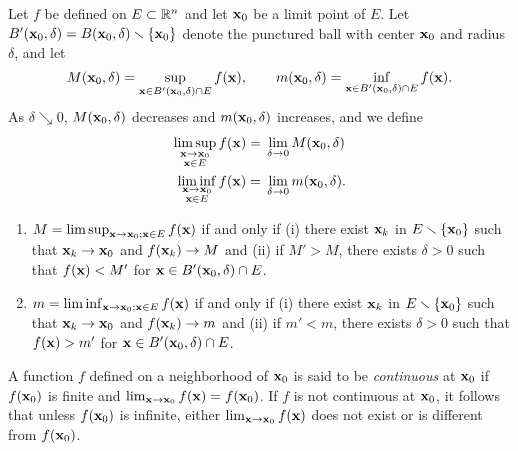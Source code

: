 Let $f$ be defined on $E\subset\mathbb{R}^n$ and let $\mathbf{x}_0$ be a limit point of
$E$. Let $B'(\mathbf{x}_0,\delta)= B(\mathbf{x}_0,\delta)\smallsetminus\{\mathbf{x}_0\}$
denote the punctured ball with center $\mathbf{x}_0$ and radius $\delta$, and let
\begin{equation}
\label{eq:sup-inf-ball}
M(\mathbf{x}_0,\delta)=\sup_{\mathbf{x}\in B'(\mathbf{x}_0,\delta)\cap E}
f(\mathbf{x}),\qquad
m(\mathbf{x}_0,\delta)=\inf_{\mathbf{x}\in B'(\mathbf{x}_0,\delta)\cap E}
f(\mathbf{x}).
\end{equation}
As $\delta\searrow 0$, $M(\mathbf{x}_0,\delta)$ decreases and $m(\mathbf{x}_0,\delta)$
increases, and we define
\begin{equation}
  \label{eq:ball-limsup-liminf}
\begin{aligned}
\limsup_{\substack{\mathbf{x}\to\mathbf{x}_0\\\mathbf{x}\in E}} f(\mathbf{x})
={}&\lim_{\delta\to 0}M(\mathbf{x}_0,\delta)\\
\liminf_{\substack{\mathbf{x}\to\mathbf{x}_0\\\mathbf{x}\in E}} f(\mathbf{x})
={}&\lim_{\delta\to 0}m(\mathbf{x}_0,\delta).
\end{aligned}
\end{equation}
\begin{theorem}[1.14]
\begin{enumerate}[label=\textnormal{(\alph*)}]
\item $M=\limsup_{\mathbf{x}\to\mathbf{x}_0;\mathbf{x}\in E} f(\mathbf{x})$ if and only if
  \textnormal{(i)} there exist ${\mathbf{x}_k}$ in $E\smallsetminus\{\mathbf{x}_0\}$ such that
  $\mathbf{x}_k\to\mathbf{x}_0$ and $f(\mathbf{x}_k)\to M$ and \textnormal{(ii)} if $M'>M$,
  there exists $\delta>0$ such that $f(\mathbf{x})<M'$ for $\mathbf{x}\in
  B'(\mathbf{x}_0,\delta)\cap E$.
\item $m=\liminf_{\mathbf{x}\to\mathbf{x}_0;\mathbf{x}\in E} f(\mathbf{x})$ if and only if
  \textnormal{(i)} there exist ${\mathbf{x}_k}$ in $E\smallsetminus\{\mathbf{x}_0\}$ such that
  $\mathbf{x}_k\to\mathbf{x}_0$ and $f(\mathbf{x}_k)\to m$ and \textnormal{(ii)} if $m'<m$,
  there exists $\delta>0$ such that $f(\mathbf{x})>m'$ for $\mathbf{x}\in
  B'(\mathbf{x}_0,\delta)\cap E$.
\end{enumerate}
\end{theorem}

A function $f$ defined on a neighborhood of $\mathbf{x}_0$ is said to be
\emph{continuous} at $\mathbf{x}_0$ if $f(\mathbf{x}_0)$ is finite and
$\lim_{\mathbf{x}\to\mathbf{x}_0}f(\mathbf{x})=f(\mathbf{x}_0)$. If $f$ is not continuous at
$\mathbf{x}_0$, it follows that unless $f(\mathbf{x}_0)$ is infinite, either
$\lim_{\mathbf{x}\to\mathbf{x}_0} f(\mathbf{x})$ does not exist or is different from
$f(\mathbf{x}_0)$.


